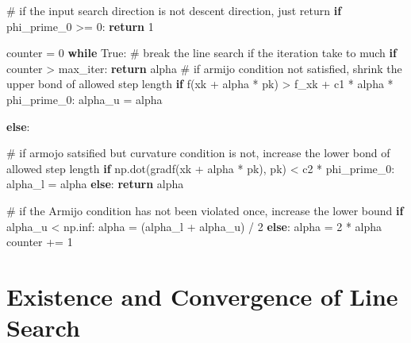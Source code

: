 \documentclass[
  letterpaper,
  DIV=11,
  numbers=noendperiod]{scrreprt}
\newenvironment{Shaded}{\begin{snugshade}}{\end{snugshade}}
\newcommand{\CommentTok}[1]{\textcolor[rgb]{0.37,0.37,0.37}{#1}}
\newcommand{\ControlFlowTok}[1]{\textcolor[rgb]{0.00,0.23,0.31}{\textbf{#1}}}
\newcommand{\DecValTok}[1]{\textcolor[rgb]{0.68,0.00,0.00}{#1}}
\newcommand{\NormalTok}[1]{\textcolor[rgb]{0.00,0.23,0.31}{#1}}
\newcommand{\OperatorTok}[1]{\textcolor[rgb]{0.37,0.37,0.37}{#1}}
\newcommand{\VariableTok}[1]{\textcolor[rgb]{0.07,0.07,0.07}{#1}}
\theoremstyle{definition}
\theoremstyle{plain}
\theoremstyle{plain}
\theoremstyle{definition}
\theoremstyle{plain}
\theoremstyle{plain}
\theoremstyle{remark}
\begin{document}
\begin{Shaded}
\begin{Highlighting}[]
    \CommentTok{\# if the input search direction is not descent direction, just return}
    \ControlFlowTok{if}\NormalTok{ phi\_prime\_0 }\OperatorTok{\textgreater{}=} \DecValTok{0}\NormalTok{:}
        \ControlFlowTok{return} \DecValTok{1}

\NormalTok{    counter }\OperatorTok{=} \DecValTok{0}
    \ControlFlowTok{while} \VariableTok{True}\NormalTok{:}
        \CommentTok{\# break the line search if the iteration take to much}
        \ControlFlowTok{if}\NormalTok{ counter }\OperatorTok{\textgreater{}}\NormalTok{ max\_iter:}
            \ControlFlowTok{return}\NormalTok{ alpha}
        \CommentTok{\# if armijo condition not satisfied, shrink the upper bond of allowed step length}
        \ControlFlowTok{if}\NormalTok{ f(xk }\OperatorTok{+}\NormalTok{ alpha }\OperatorTok{*}\NormalTok{ pk) }\OperatorTok{\textgreater{}}\NormalTok{ f\_xk }\OperatorTok{+}\NormalTok{ c1 }\OperatorTok{*}\NormalTok{ alpha }\OperatorTok{*}\NormalTok{ phi\_prime\_0:}
\NormalTok{            alpha\_u }\OperatorTok{=}\NormalTok{ alpha}

        \ControlFlowTok{else}\NormalTok{:}

            \CommentTok{\# if armojo satsified but curvature condition is not, increase the lower bond of allowed step length}
            \ControlFlowTok{if}\NormalTok{ np.dot(gradf(xk }\OperatorTok{+}\NormalTok{ alpha }\OperatorTok{*}\NormalTok{ pk), pk) }\OperatorTok{\textless{}}\NormalTok{ c2 }\OperatorTok{*}\NormalTok{ phi\_prime\_0:}
\NormalTok{                alpha\_l }\OperatorTok{=}\NormalTok{ alpha}
            \ControlFlowTok{else}\NormalTok{:}
                \ControlFlowTok{return}\NormalTok{ alpha}
        
        \CommentTok{\# if the Armijo condition has not been violated once, increase the lower bound}
        \ControlFlowTok{if}\NormalTok{ alpha\_u }\OperatorTok{\textless{}}\NormalTok{ np.inf:}
\NormalTok{            alpha }\OperatorTok{=}\NormalTok{ (alpha\_l }\OperatorTok{+}\NormalTok{ alpha\_u) }\OperatorTok{/} \DecValTok{2}
        \ControlFlowTok{else}\NormalTok{:}
\NormalTok{            alpha }\OperatorTok{=} \DecValTok{2} \OperatorTok{*}\NormalTok{ alpha}
\NormalTok{        counter }\OperatorTok{+=} \DecValTok{1}
\end{Highlighting}
\end{Shaded}

\section{Existence and Convergence of Line
Search}\label{existence-and-convergence-of-line-search}
\end{document}
